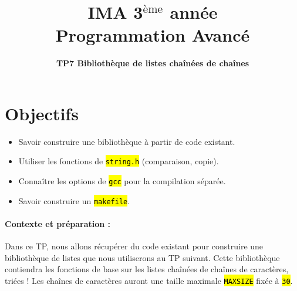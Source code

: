 \documentclass[final, a4paper, openbib, ]{article}
\title{IMA 3$^{\mbox{\`eme}}$ année\\ Programmation Avancé
}
\author{\huge \textbf{TP7 Bibliothèque de listes chaînées de chaînes}}
\date{}
\let\OldTexttt\texttt
\renewcommand{\texttt}[1]{\OldTexttt{\hl{#1}}}
\begin{document}
\posttitle{\par\end{center}}
\setlength{\droptitle}{-45pt}
\maketitle

\vspace{-1.7cm}
\section{Objectifs}

\begin{itemize}
	\item Savoir construire une bibliothèque à partir de code existant.
	\item Utiliser les fonctions de \texttt{string.h} (comparaison, copie).
	\item Connaître les options de \texttt{gcc} pour la compilation séparée.
	\item Savoir construire un \texttt{makefile}.
\end{itemize}


\paragraph{Contexte et préparation : } Dans ce TP, nous allons récupérer du code existant pour construire une
bibliothèque de listes que nous utiliserons au TP suivant. Cette bibliothèque contiendra les fonctions de base
sur les listes chaînées de chaînes de caractères, triées ! Les chaînes de caractères auront une taille
maximale \texttt{MAXSIZE} fixée à \texttt{30}.
\end{document}
